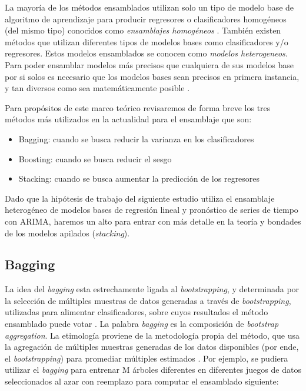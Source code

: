 La mayoría de los métodos ensamblados utilizan solo un tipo de modelo base de algoritmo de aprendizaje para producir regresores o clasificadores homogéneos (del mismo tipo) conocidos como \textit{ensamblajes homogéneos} \cite{smolyakov}. También existen métodos que utilizan diferentes tipos de modelos bases como clasificadores y/o regresores. Estos modelos ensamblados se conocen como \textit{modelos heterogeneos}. Para poder ensamblar modelos más precisos que cualquiera de sus modelos base por si solos es necesario que los modelos bases sean precisos en primera instancia, y tan diversos como sea matemáticamente posible \cite{smolyakov}.

Para propósitos de este marco teórico revisaremos de forma breve los tres métodos más utilizados en la actualidad para el ensamblaje que son:
\begin{itemize}
  \item Bagging: cuando se busca reducir la varianza en los clasificadores
  \item Boosting: cuando se busca reducir el sesgo 
  \item Stacking: cuando se busca aumentar la predicción de los regresores
\end{itemize}

Dado que la hipótesis de trabajo del siguiente estudio utiliza el ensamblaje heterogéneo de modelos bases de regresión lineal y pronóstico de series de tiempo con ARIMA, haremos un alto para entrar con más detalle en la teoría y bondades de los modelos apilados (\emph{stacking}).

\subsection{Bagging}
La idea del \emph{bagging} esta estrechamente ligada al \emph{bootstrapping}, y determinada por la selección de múltiples muestras de datos generadas a través de \emph{bootstrapping}, utilizadas para alimentar clasificadores, sobre cuyos resultados el método ensamblado puede votar \cite{daume}. La palabra \emph{bagging} es la composición de \emph{bootstrap aggregation}. La etimología proviene de la metodología propia del método, que usa la agregación de múltiples muestras generadas de los datos disponibles (por ende, el \emph{bootstrapping}) para promediar múltiples estimados \cite{smolyakov}. 
Por ejemplo, se pudiera utilizar el \emph{bagging} para entrenar M árboles diferentes en diferentes juegos de datos seleccionados al azar con reemplazo para computar el ensamblado siguiente:  

